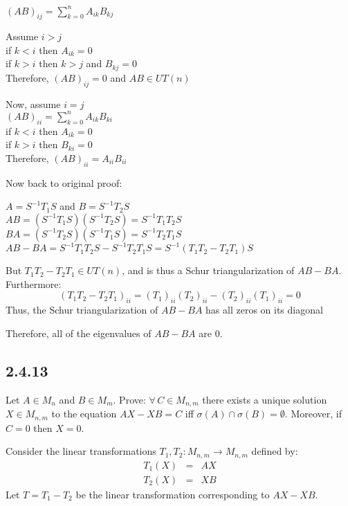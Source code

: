 \documentclass[letterpaper,12pt,fleqn]{article}
\renewcommand{\o}{\sigma}
\begin{document}
\begin{theproof}
  $(AB)_{ij}=\sum_{k=0}^nA_{ik}B_{kj}$

  Assume $i>j$ \\
  if $k<i$ then $A_{ik}=0$ \\
  if $k>i$ then $k>j$ and $B_{kj}=0$ \\
  Therefore, $(AB)_{ij}=0$ and $AB\in UT(n)$

  Now, assume $i=j$ \\
  $(AB)_{ii}=\sum_{k=0}^nA_{ik}B_{ki}$ \\
  if $k<i$ then $A_{ik}=0$ \\
  if $k>i$ then $B_{ki}=0$ \\
  Therefore, $(AB)_{ii}=A_{ii}B_{ii}$
\end{theproof}

Now back to original proof:

$A=S^{-1}T_1S$ and $B=S^{-1}T_2S$ \\
$AB=(S^{-1}T_1S)(S^{-1}T_2S)=S^{-1}T_1T_2S$ \\
$BA=(S^{-1}T_2S)(S^{-1}T_1S)=S^{-1}T_2T_1S$ \\
$AB-BA=S^{-1}T_1T_2S-S^{-1}T_2T_1S=S^{-1}(T_1T_2-T_2T_1)S$

But $T_1T_2-T_2T_1\in UT(n)$, and is thus a Schur triangularization of
$AB-BA$. Furthermore:
\[(T_1T_2-T_2T_1)_{ii}=(T_1)_{ii}(T_2)_{ii}-(T_2)_{ii}(T_1)_{ii}=0\]
Thus, the Schur triangularization of $AB-BA$ has all zeros on its diagonal

Therefore, all of the eigenvalues of $AB-BA$ are $0$.

\subsection*{2.4.13}

Let $A\in M_n$ and $B\in M_m$. Prove: $\forall\,C\in M_{n,m}$ there exists a unique
solution $X\in M_{n,m}$ to the equation $AX-XB=C$ iff $\o(A)\cap\o(B)=\emptyset$.
Moreover, if $C=0$ then $X=0$.

Consider the linear transformations $T_1,T_2:M_{n,m}\to M_{n,m}$ defined by:
\begin{eqnarray*}
  T_1(X) &=& AX \\
  T_2(X) &=& XB
\end{eqnarray*}
Let $T=T_1-T_2$ be the linear transformation corresponding to $AX-XB$.
\end{document}
